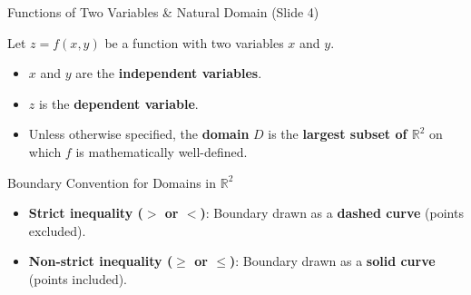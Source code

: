 \documentclass[aspectratio=169,10pt]{beamer}
\begin{document}
\begin{frame}{Functions of Two Variables \& Natural Domain (Slide 4)}
  \begin{definition}
    Let $z = f(x, y)$ be a function with two variables $x$ and $y$.
    \begin{itemize}
      \item $x$ and $y$ are the \textbf{independent variables}.
      \item $z$ is the \textbf{dependent variable}.
      \item Unless otherwise specified, the \textbf{domain} $D$ is the \textbf{largest subset of $\mathbb{R}^2$} on which $f$ is mathematically well-defined.
    \end{itemize}
  \end{definition}

  \vspace{0.2em}
  \begin{block}{Boundary Convention for Domains in $\mathbb{R}^2$}
    \small
    \begin{itemize}
      \item \textbf{Strict inequality ($>$ or $<$)}: Boundary drawn as a \textbf{dashed curve} (points excluded).
      \item \textbf{Non-strict inequality ($\ge$ or $\le$)}: Boundary drawn as a \textbf{solid curve} (points included).
    \end{itemize}
  \end{block}
\end{frame}
\end{document}
